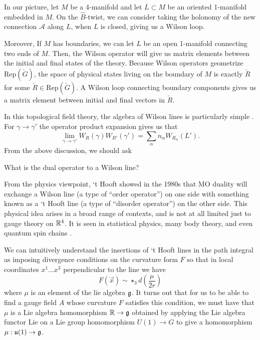 	In our picture, let $M$ be a 4-manifold and let $L \subset M$ be an oriented 1-manifold embedded in $M$. On the $\hat B$-twist, we can consider taking the holonomy of the new connection $\mathcal A$ along $L$, when $L$ is closed, giving us a Wilson loop. 
	
	
	Moreover, If $M$ has boundaries, we can let $L$ be an open 1-manifold connecting two ends of $M$. Then, the Wilson operator will give us matrix elements between the initial and final states of the theory. Because Wilson operators geometrize $\mathrm{Rep}(\check G)$, the space of physical states living on the boundary of $M$ is exactly $\check R$ for some $\check R \in \mathrm{Rep}(\check G)$. A Wilson loop connecting boundary components gives us a matrix element between initial and final vectors in $\check R$.
	
	In this topological field theory, the algebra of Wilson lines is particularly simple \cite{kapustin2006}. For $\gamma \to \gamma'$ the operator product expansion gives us that
		\begin{equation}
			\lim_{\gamma \to \gamma'} W_R (\gamma) W_{R'} (\gamma') = \sum_\alpha n_\alpha W_{R_\alpha}(L').
		\end{equation}
	From the above discussion, we should ask 
	\begin{ques}
		What is the dual operator to a Wilson line?
	\end{ques}
	From the physics viewpoint, `t Hooft showed in the 1980s that MO duality will exchange a Wilson line (a type of ``order operator'') on one side with something known as a `t Hooft line (a type of ``disorder operator'') on the other side. This physical idea arises in a broad range of contexts, and is not at all limited just to gauge theory on $\rr^4$. It is seen in statistical physics, many body theory, and even quantum spin chains \cite{kardar2007}.
	
	We can intuitively understand the insertions of `t Hooft lines in the path integral as imposing divergence conditions on the curvature form $F$ so that in local coordinates $x^1 \dots x^3$ perpendicular to the line we have
		\begin{equation}\label{eq:Amod}
			F(\vec{x}) \sim \star_3 d\left( \frac{\mu}{2r} \right)
		\end{equation}
		where $\mu$ is an element of the lie algebra $\frak g$. It turns out that for us to be able to find a gauge field $A$ whose curvature $F$ satisfies this condition, we must have that $\mu$ is a Lie algebra homomorphism $\mathbb R \to \frak g$ obtained by applying the Lie algebra functor $\mathrm{Lie}$ on a Lie group homomorphism $U(1) \to G$ to give a homomorphism $\mu: \frak u(1) \to \gg$.
		
